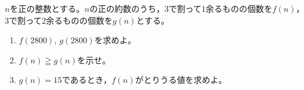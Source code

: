 \documentclass[../../main.tex]{subfiles}
\begin{document}
$n$を正の整数とする。$n$の正の約数のうち，3で割って1余るものの個数を$f(n)$，
3で割って2余るものの個数を$g(n)$とする。
\begin{enumerate}
  \item$f(2800), \, g(2800)$を求めよ。
  \item$f(n) \geqq g(n)$を示せ。
  \item$g(n)=15$であるとき，$f(n)$がとりうる値を求めよ。
\end{enumerate}
\end{document}
